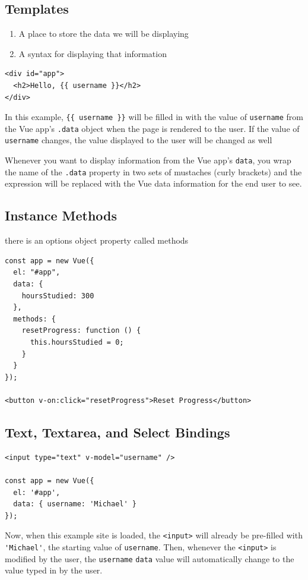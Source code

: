 \documentclass[a4paper, 12pt]{article}
\begin{document}
\subsection{Templates}
\begin{enumerate}
\item A place to store the data we will be displaying
\item A syntax for displaying that information
\end{enumerate}

\begin{verbatim}
<div id="app">
  <h2>Hello, {{ username }}</h2>
</div>
\end{verbatim}

In this example, \verb|{{ username }}| will be filled in with the value of \verb|username| from the Vue app's \verb|.data| object when the page is rendered to the user. If the value of \verb|username| changes, the value displayed to the user will be changed as well

Whenever you want to display information from the Vue app's \verb|data|, you wrap the name of the \verb|.data| property in two sets of mustaches (curly brackets) and the expression will be replaced with the Vue data information for the end user to see.

\subsection{Instance Methods}
there is an options object property called methods
\begin{verbatim}
const app = new Vue({
  el: "#app",
  data: {
    hoursStudied: 300
  },
  methods: {
    resetProgress: function () {
      this.hoursStudied = 0;
    }
  }
});

<button v-on:click="resetProgress">Reset Progress</button>
\end{verbatim}

\subsection{Text, Textarea, and Select Bindings}
\begin{verbatim}
<input type="text" v-model="username" />

const app = new Vue({ 
  el: '#app',
  data: { username: 'Michael' } 
});
\end{verbatim}
Now, when this example site is loaded, the \verb|<input>| will already be pre-filled with \verb|'Michael'|, the starting value of \verb|username|. Then, whenever the \verb|<input>| is modified by the user, the \verb|username| \verb|data| value will automatically change to the value typed in by the user.
\end{document}
